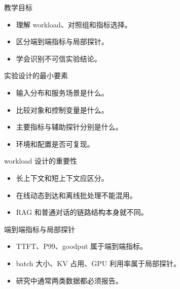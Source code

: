 




\begin{frame}[plain]
  \titlepage
\end{frame}

\begin{frame}{教学目标}
  \begin{itemize}
    \item 理解 workload、对照组和指标选择。
    \item 区分端到端指标与局部探针。
    \item 学会识别不可信实验结论。
  \end{itemize}
\end{frame}

\begin{frame}{实验设计的最小要素}
  \begin{itemize}
    \item 输入分布和服务场景是什么。
    \item 比较对象和控制变量是什么。
    \item 主要指标与辅助探针分别是什么。
    \item 环境和配置是否可复现。
  \end{itemize}
\end{frame}

\begin{frame}{workload 设计的重要性}
  \begin{itemize}
    \item 长上下文和短上下文应区分。
    \item 在线动态到达和离线批处理不能混用。
    \item RAG 和普通对话的链路结构本身就不同。
  \end{itemize}
\end{frame}

\begin{frame}{端到端指标与局部探针}
  \begin{itemize}
    \item TTFT、P99、goodput 属于端到端指标。
    \item batch 大小、KV 占用、GPU 利用率属于局部探针。
    \item 研究中通常两类数据都必须报告。
  \end{itemize}
\end{frame}

